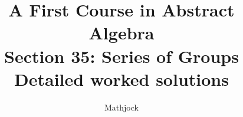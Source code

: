 
\title{\textbf{A First Course in Abstract Algebra}\\[0.3em]Section 35: Series of Groups\\[0.3em]\large Detailed worked solutions}
\author{Mathjock}
\date{}

\maketitle
\bookinfo
\tableofcontents
\clearpage
\renewcommand{\thesection}{35}
\renewcommand{\theHsection}{fraleigh.35}



